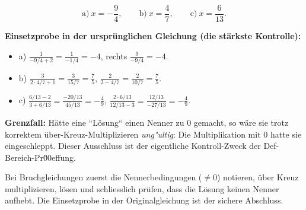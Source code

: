 \begin{ergebnis}
\begin{equation*}
  \text{a)}\ x=-\frac94,\qquad
  \text{b)}\ x=\frac47,\qquad
  \text{c)}\ x=\frac6{13}.
\end{equation*}
\end{ergebnis}

\begin{kontrolle}
\textbf{Einsetzprobe in der ursprünglichen Gleichung (die stärkste
Kontrolle):}
\begin{itemize}
  \item a) $\frac{1}{-9/4+2}=\frac{1}{-1/4}=-4$, rechts
        $\frac{9}{-9/4}=-4$. \checkmark
  \item b) $\frac3{2\cdot4/7+1}=\frac3{15/7}=\frac75$,
        $\frac2{2-4/7}=\frac2{10/7}=\frac75$. \checkmark
  \item c) $\frac{6/13-2}{3+6/13}=\frac{-20/13}{45/13}=-\frac49$,
        $\frac{2\cdot6/13}{12/13-3}=\frac{12/13}{-27/13}=-\frac49$.
        \checkmark
\end{itemize}

\textbf{Grenzfall:} Hätte eine ``L\"osung`` einen Nenner zu $0$ gemacht,
so wäre sie trotz korrektem über-Kreuz-Multiplizieren \emph{ung"ultig}:
Die Multiplikation mit $0$ hatte sie eingeschleppt. Dieser Ausschluss ist
der eigentliche Kontroll-Zweck der Def-Bereich-Pr\u00effung.
\end{kontrolle}

\begin{merksatz}
Bei Bruchgleichungen zuerst die Nennerbedingungen ($\neq0$) notieren,
über Kreuz multiplizieren, lösen und schliesslich prüfen, dass die Lösung
keinen Nenner aufhebt. Die Einsetzprobe in der Originalgleichung ist der
sichere Abschluss.
\end{merksatz}
